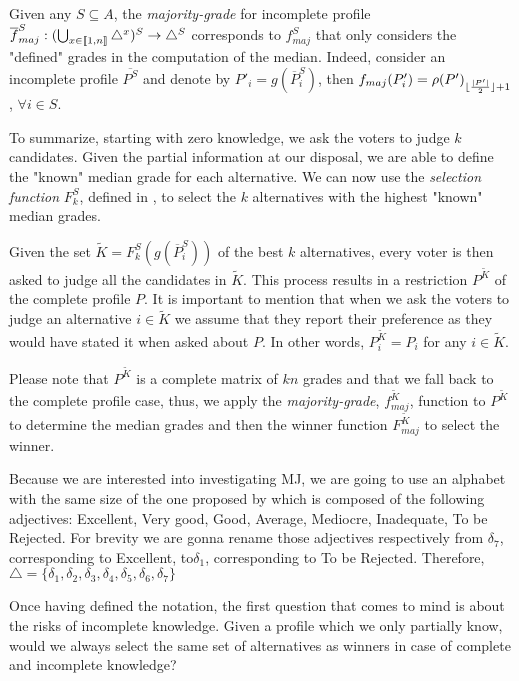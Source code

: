 \documentclass[version=3.21, pagesize, twoside=off, bibliography=totoc, DIV=calc, fontsize=12pt, a4paper]{scrartcl}
\begin{document}
Given any $S \subseteq A$, the \emph{majority-grade} for incomplete profile $\overline{f}^S_{maj}: (\bigcup_{x \in \llbracket1,n\rrbracket}\triangle^{x})^S \rightarrow \triangle^S$ corresponds to $f^S_{maj}$ that only considers the "defined" grades in the computation of the median. Indeed, consider an incomplete profile $\overline{P^S}$ and denote by $P'_i=g(\overline{P}^S_i)$, then ${f}_{maj}(P'_i) = \rho(P')_{\lfloor\frac{\lvert P'\rvert}{2}\rfloor + 1}$, $\forall i \in S$.

To summarize, starting with zero knowledge, we ask the voters to judge $k$ candidates. Given the partial information at our disposal, we are able to define the "known" median grade for each alternative. We can now use the \emph{selection function} $F^S_k$, defined in , to select the $k$ alternatives with the highest "known" median grades.

Given the set $\tilde{K}=F^S_k(g(\overline{P}^S_i))$ of the best $k$ alternatives, every voter is then asked to judge all the candidates in $\tilde{K}$. 
This process results in a restriction $P^{\tilde{K}}$ of the complete profile $P$. It is important to mention that when we ask the voters to judge an alternative $i\in \tilde{K}$ we assume that they report their preference as they would have stated it when asked about $P$. In other words, $P^{\tilde{K}}_{i} = P_i$ for any $i \in \tilde{K}$.

Please note that $P^{\tilde{K}}$ is a complete matrix of $kn$ grades and that we fall back to the complete profile case, thus, we apply the \emph{majority-grade}, $f^{\tilde{K}}_{maj}$, function to $P^{\tilde{K}}$ to determine the median grades and then the winner function $F^{\tilde{K}}_{maj}$ to select the winner. 

\begin{remark}
	Because we are interested into investigating \acs{MJ}, we are going to use an alphabet with the same size of the one proposed by \citet{Balinski2011} which is composed of the following adjectives: Excellent, Very good, Good, Average, Mediocre, Inadequate, To be Rejected. For brevity we are gonna rename those adjectives respectively from $\delta_7$, corresponding to Excellent, to$\delta_1$, corresponding to To be Rejected. Therefore, $\triangle=\{\delta_1,\delta_2, \delta_3,\delta_4,\delta_5,\delta_6,\delta_7\}$ 
\end{remark}

Once having defined the notation, the first question that comes to mind is about the risks of incomplete knowledge. Given a profile which we only partially know, would we always select the same set of alternatives as winners in case of complete and incomplete knowledge?
\end{document}
